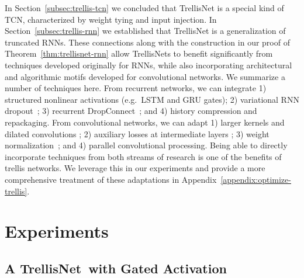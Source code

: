 \documentclass{article} \usepackage{iclr2019_conference,times}
\newcommand{\model}{TrellisNet}
\begin{document}
In Section~\ref{subsec:trellis-tcn} we concluded that TrellisNet is a special kind of TCN, characterized by weight tying and input injection. In Section~\ref{subsec:trellis-rnn} we established that TrellisNet is a generalization of truncated RNNs. These connections along with the construction in our proof of Theorem~\ref{thm:trellisnet-rnn} allow TrellisNets to benefit significantly from techniques developed originally for RNNs, while also incorporating architectural and algorithmic motifs developed for convolutional networks.
We summarize a number of techniques here. From recurrent networks, we can integrate
1) structured nonlinear activations (e.g.\ LSTM and GRU gates);
2) variational RNN dropout~\citep{gal2016dropout};
3) recurrent DropConnect~\citep{merityRegOpt}; and
4) history compression and repackaging.
From convolutional networks, we can adapt
1) larger kernels and dilated convolutions \citep{dilatedConv};
2) auxiliary losses at intermediate layers \citep{lee2015deeply,xie2015holistically};
3) weight normalization~\citep{Salimans2016}; and
4) parallel convolutional processing.
Being able to directly incorporate techniques from both streams of research is one of the benefits of trellis networks. We leverage this in our experiments and provide a more comprehensive treatment of these adaptations in Appendix~\ref{appendix:optimize-trellis}.




\section{Experiments}
\label{sec:experiments}
\vspace{-.05in}

\subsection{A \model~with Gated Activation}
\label{subsec:lstm-trellis}
\end{document}
